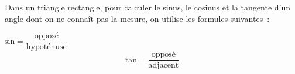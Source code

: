 Dans un triangle rectangle, pour calculer le sinus, le cosinus et la tangente
d'un angle dont on ne connaît pas la mesure, on utilise les formules
suivantes~:\par{}\smallskip
$\text{sin}=\dfrac{\text{opposé}}{\text{hypoténuse}}$\hskip50pt
$$\text{tan}=\dfrac{\text{opposé}}{\text{adjacent}}$$
